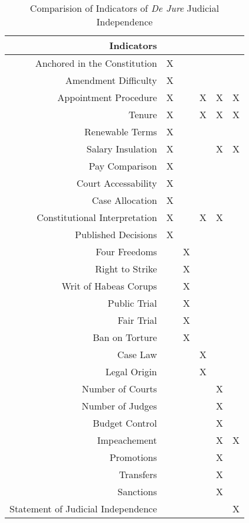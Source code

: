 \documentclass[12pt]{article}
\begin{document}
\begin{landscape}
	\begin{table}[!tbh]\centering\caption{Comparision of Indicators of \textit{De Jure} Judicial Independence}\label{otherindicators}\small
		\begin{tabular}{rccccc}\hline
			Indicators	&	\citet{Feld2003}	&	\citet{Keith2002a}	&	\citet{Laporta2004}	&	\citet{Rios2006}	&	\citet{Melton2014}	\\\hline
			Anchored in the Constitution	&	X	&		&		&		&		\\
			Amendment Difficulty	&	X	&		&		&		&		\\
			Appointment Procedure	&	X	&		&	X	&	X	&	X	\\
			Tenure	&	X	&		&	X	&	X	&	X	\\
			Renewable Terms	&	X	&		&		&		&		\\
			Salary Insulation	&	X	&		&		&	X	&	X	\\
			Pay Comparison	&	X	&		&		&		&		\\
			Court Accessability	&	X	&		&		&		&		\\
			Case Allocation	&	X	&		&		&		&		\\
			Constitutional Interpretation	&	X	&		&	X	&	X	&		\\
			Published Decisions	&	X	&		&		&		&		\\
			Four Freedoms	&		&	X	&		&		&		\\
			Right to Strike	&		&	X	&		&		&		\\
			Writ of Habeas Corups	&		&	X	&		&		&		\\
			Public Trial	&		&	X	&		&		&		\\
			Fair Trial	&		&	X	&		&		&		\\
			Ban on Torture	&		&	X	&		&		&		\\
			Case Law	&		&		&	X	&		&		\\
			Legal Origin	&		&		&	X	&		&		\\
			Number of Courts	&		&		&		&	X	&		\\
			Number of Judges	&		&		&		&	X	&		\\
			Budget Control	&		&		&		&	X	&		\\
			Impeachement	&		&		&		&	X	&	X	\\
			Promotions	&		&		&		&	X	&		\\
			Transfers	&		&		&		&	X	&		\\
			Sanctions	&		&		&		&	X	&		\\
			Statement of Judicial Independence	&		&		&		&		&	X	\\\hline
		\end{tabular}
	\end{table}
\end{landscape}
\restoregeometry
\end{document}

